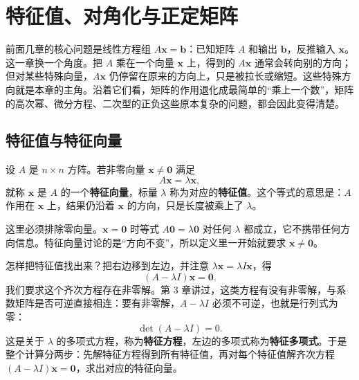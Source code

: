 \documentclass[UTF8,a4paper,12pt]{ctexart}
\numberwithin{equation}{section}
\begin{document}
	\section{特征值、对角化与正定矩阵}

	前面几章的核心问题是线性方程组 $A\bm{x}=\bm{b}$：已知矩阵 $A$ 和输出 $\bm{b}$，反推输入 $\bm{x}$。这一章换一个角度。把 $A$ 乘在一个向量 $\bm{x}$ 上，得到的 $A\bm{x}$ 通常会转向别的方向；但对某些特殊向量，$A\bm{x}$ 仍停留在原来的方向上，只是被拉长或缩短。这些特殊方向就是本章的主角。沿着它们看，矩阵的作用退化成最简单的“乘上一个数”，矩阵的高次幂、微分方程、二次型的正负这些原本复杂的问题，都会因此变得清楚。

	\subsection{特征值与特征向量}

	设 $A$ 是 $n\times n$ 方阵。若非零向量 $\bm{x}\neq\bm{0}$ 满足
	\begin{equation}\label{eq:7.1}
	A\bm{x}=\lambda\bm{x},
	\end{equation}
	就称 $\bm{x}$ 是 $A$ 的一个\textbf{特征向量}，标量 $\lambda$ 称为对应的\textbf{特征值}。这个等式的意思是：$A$ 作用在 $\bm{x}$ 上，结果仍沿着 $\bm{x}$ 的方向，只是长度被乘上了 $\lambda$。

	这里必须排除零向量。$\bm{x}=\bm{0}$ 时等式 $A\bm{0}=\lambda\bm{0}$ 对任何 $\lambda$ 都成立，它不携带任何方向信息。特征向量讨论的是“方向不变”，所以定义里一开始就要求 $\bm{x}\neq\bm{0}$。

	怎样把特征值找出来？把右边移到左边，并注意 $\lambda\bm{x}=\lambda I\bm{x}$，得
	\begin{equation}\label{eq:7.2}
	(A-\lambda I)\bm{x}=\bm{0}.
	\end{equation}
	我们要求这个齐次方程存在非零解。第 3 章讲过，这类方程有没有非零解，与系数矩阵是否可逆直接相连：要有非零解，$A-\lambda I$ 必须不可逆，也就是行列式为零：
	\begin{equation}\label{eq:7.3}
	\boxed{\det(A-\lambda I)=0.}
	\end{equation}
	这是关于 $\lambda$ 的多项式方程，称为\textbf{特征方程}，左边的多项式称为\textbf{特征多项式}。于是整个计算分两步：先解特征方程得到所有特征值，再对每个特征值解齐次方程 $(A-\lambda I)\bm{x}=\bm{0}$，求出对应的特征向量。
\end{document}
